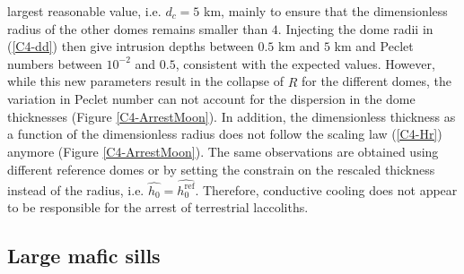 largest reasonable value, i.e.  $d_c=5$  km, mainly to ensure that the
dimensionless  radius of  the other  domes remains  smaller than  $4$.
Injecting the dome  radii in (\ref{C4-dd}) then  give intrusion depths
between $0.5$ km  and $5$ km and Peclet numbers  between $10^{-2}$ and
$0.5$, consistent with  the expected values.  However,  while this new
parameters  result in  the  collapse of  $\hat{R}$  for the  different
domes,  the  variation  in  Peclet  number can  not  account  for  the
dispersion in  the dome thicknesses (Figure  \ref{C4-ArrestMoon}).  In
addition,   the  dimensionless   thickness  as   a  function   of  the
dimensionless  radius does  not follow  the scaling  law (\ref{C4-Hr})
anymore  (Figure  \ref{C4-ArrestMoon}).   The  same  observations  are
obtained using different  reference domes or by  setting the constrain
on   the   rescaled   thickness    instead   of   the   radius,   i.e.
$\hat{h_0}=\hat{h_0^{\text{ref}}}$.   Therefore,   conductive  cooling
does  not appear  to  be  responsible for  the  arrest of  terrestrial
laccoliths.

\subsection{Large mafic sills}
\label{sec:large-mafic-sill}


